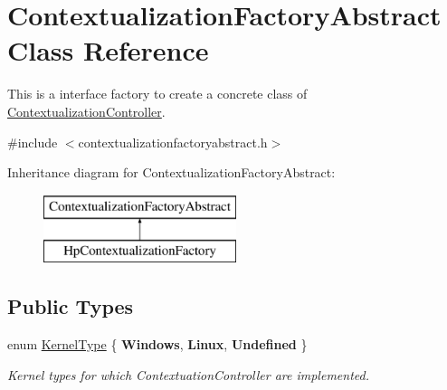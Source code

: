 \hypertarget{classContextualizationFactoryAbstract}{}\section{Contextualization\+Factory\+Abstract Class Reference}
\label{classContextualizationFactoryAbstract}


This is a interface factory to create a concrete class of \mbox{\hyperlink{classContextualizationController}{Contextualization\+Controller}}.  




{\ttfamily \#include $<$contextualizationfactoryabstract.\+h$>$}

Inheritance diagram for Contextualization\+Factory\+Abstract\+:\begin{figure}[H]
\begin{center}
\leavevmode
\includegraphics[height=2.000000cm]{classContextualizationFactoryAbstract}
\end{center}
\end{figure}
\subsection*{Public Types}
\begin{DoxyCompactItemize}
\item 
\mbox{\label{classContextualizationFactoryAbstract_a87cd3e6ea2f582fe98286a73d3b28f60}} 
enum \mbox{\hyperlink{classContextualizationFactoryAbstract_a87cd3e6ea2f582fe98286a73d3b28f60}{Kernel\+Type}} \{ {\bfseries Windows}, 
{\bfseries Linux}, 
{\bfseries Undefined}
 \}
\begin{DoxyCompactList}\small\item\em Kernel types for which Contextuation\+Controller are implemented. \end{DoxyCompactList}\end{DoxyCompactItemize}
